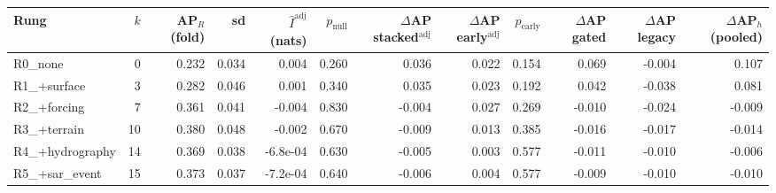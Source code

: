 \begin{tabular}{lrrrrrrrrrrr}
\toprule
Rung & $k$ & AP$_R$ (fold) & sd & $\hat I^{\mathrm{adj}}$ (nats) & $p_{\mathrm{null}}$ & $\Delta$AP stacked$^{\mathrm{adj}}$ & $\Delta$AP early$^{\mathrm{adj}}$ & $p_{\mathrm{early}}$ & $\Delta$AP gated & $\Delta$AP legacy & $\Delta$AP$_h$ (pooled) \\
\midrule
R0\_none & 0 & 0.232 & 0.034 & 0.004 & 0.260 & 0.036 & 0.022 & 0.154 & 0.069 & -0.004 & 0.107 \\
R1\_+surface & 3 & 0.282 & 0.046 & 0.001 & 0.340 & 0.035 & 0.023 & 0.192 & 0.042 & -0.038 & 0.081 \\
R2\_+forcing & 7 & 0.361 & 0.041 & -0.004 & 0.830 & -0.004 & 0.027 & 0.269 & -0.010 & -0.024 & -0.009 \\
R3\_+terrain & 10 & 0.380 & 0.048 & -0.002 & 0.670 & -0.009 & 0.013 & 0.385 & -0.016 & -0.017 & -0.014 \\
R4\_+hydrography & 14 & 0.369 & 0.038 & -6.8e-04 & 0.630 & -0.005 & 0.003 & 0.577 & -0.011 & -0.010 & -0.006 \\
R5\_+sar\_event & 15 & 0.373 & 0.037 & -7.2e-04 & 0.640 & -0.006 & 0.004 & 0.577 & -0.009 & -0.010 & -0.010 \\
\bottomrule
\end{tabular}
